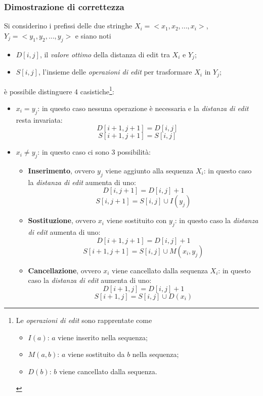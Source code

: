 \subsubsection{Dimostrazione di correttezza}
    Si considerino i prefissi delle due stringhe $X_i = <x_1, x_2, ..., x_i>$, $Y_j = <y_1, y_2, ..., y_j>$ e siano noti
    \begin{itemize}
        \item $D[i, j]$, il \emph{valore ottimo} della distanza di edit tra $X_{i}$ e $Y_{j}$;
        \item $S[i, j]$, l'insieme delle \emph{operazioni di edit} per trasformare $X_i$ in $Y_j$;
    \end{itemize} è possibile distinguere 4 casistiche\footnote{Le \emph{operazioni di edit} sono rapprentate come \begin{itemize}
        \item $I(a)$: $a$ viene inserito nella sequenza;
        \item $M(a, b)$: $a$ viene sostituito da $b$ nella sequenza;
        \item $D(b)$: $b$ viene cancellato dalla sequenza.
    \end{itemize}}:
    \begin{itemize}
        \item $x_i = y_j$: in questo caso nessuna operazione è necessaria e la \emph{distanza di edit} resta invariata:
            $$D[i + 1, j + 1] = D[i, j]$$
            $$S[i + 1, j + 1] = S[i,j]$$ 
        
        \item $x_i \neq y_j$: in questo caso ci sono 3 possibilità: 
        \begin{itemize}
            \item \textbf{Inserimento}, ovvero $y_j$ viene aggiunto alla sequenza $X_i$: in questo caso la \emph{distanza di edit} aumenta di uno:
            $$D[i, j + 1] = D[i, j] + 1$$
            $$S[i, j + 1] = S[i, j] \cup I(y_j)$$

            \item \textbf{Sostituzione}, ovvero $x_i$ viene sostituito con $y_j$: in questo caso la \emph{distanza di edit} aumenta di uno:
            $$D[i + 1, j + 1] = D[i, j] + 1$$
            $$S[i + 1, j + 1] = S[i, j] \cup M(x_i, y_j)$$

            \item \textbf{Cancellazione}, ovvero $x_i$ viene cancellato dalla sequenza $X_i$: in questo caso la \emph{distanza di edit} aumenta di uno:
            $$D[i + 1, j] = D[i, j] + 1$$
            $$S[i + 1, j] = S[i, j] \cup D(x_i)$$
        \end{itemize}
    \end{itemize}
        
